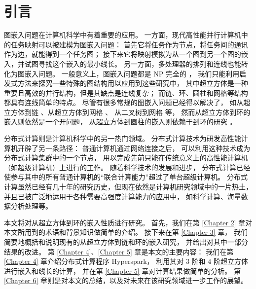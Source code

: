 
\chapter{引言}
\label{Chapter 1}

图嵌入问题在计算机科学中有着重要的应用。
一方面，现代高性能并行计算机中的任务映射可以被建模为图嵌入问题：
首先它将任务作为节点，将任务间的通讯作为边，就能得到一个任务图；
接下来它将映射模拟为从一个图到另一个图的嵌入，并试图寻找这个嵌入的最小线长。
另一方面，多处理器的排列和连线也能转化为图嵌入问题。
一般意义上，图嵌入问题都是 NP 完全的 \cite{Garey.1979}，
我们只能利用启发式方法来探究一些特殊的图结构用以应用到这些研究中，
其中超立方体是一种重要且高效的并行结构，但是其缺点是连线复杂；
而链、环、圆柱和网格等结构都具有连线简单的特点。
尽管有很多常规的图嵌入问题已经得以解决了，
如从超立方体到链 \cite{Harper.1964}、从超立方体到网格 \cite{Manuel.2009}、
从二叉树到网格 \cite{Opatrny.2000} 等，
然而从超立方体到环的嵌入则依然是一个开问题，
从超立方体到圆柱的嵌入则依赖于到环的研究 \cite{Ji.2015}。

分布式计算则是计算机科学中的另一热门领域。
分布式计算技术为研发高性能计算机开辟了另一条路径：
普通计算机通过网络连接之后，
可以利用这种技术成为分布式计算集群中的一个节点，
用以完成先前只能在传统意义上的高性能计算机（如超级计算机）上进行的工作。
随着科学技术的发展和进步，
分布式计算已经使参与其中的所有普通计算机的“联合计算能力”超过了单台超级计算机。
分布式计算虽然已经有几十年的研究历史，但现在依然是计算机研究领域中的一片热土，
并且已被广泛地运用于各种需要高强度计算能力的应用中，
如科学计算、海量数据分析处理等。

本文将对从超立方体到环的嵌入性质进行研究。
首先，我们在第 \ref{Chapter 2} 章对本文所用到的术语和背景知识做简单的介绍。
接下来在第 \ref{Chapter 3} 章，
我们简要地概括和说明现有的从超立方体到链和环的嵌入研究，
并给出对其中一部分结果的改进。
第 \ref{Chapter 4}、\ref{Chapter 5} 章是本文的主要内容：
我们在第 \ref{Chapter 4} 章介绍分布式计算程序 Hyperspark，
利用其对 $3$ 阶和 $4$ 阶超立方体进行嵌入和线长的计算，
并在第 \ref{Chapter 5} 章对计算结果做简单的分析。
第 \ref{Chapter 6} 章则是对本文的总结，以及对未来在该研究领域进一步工作的展望。
